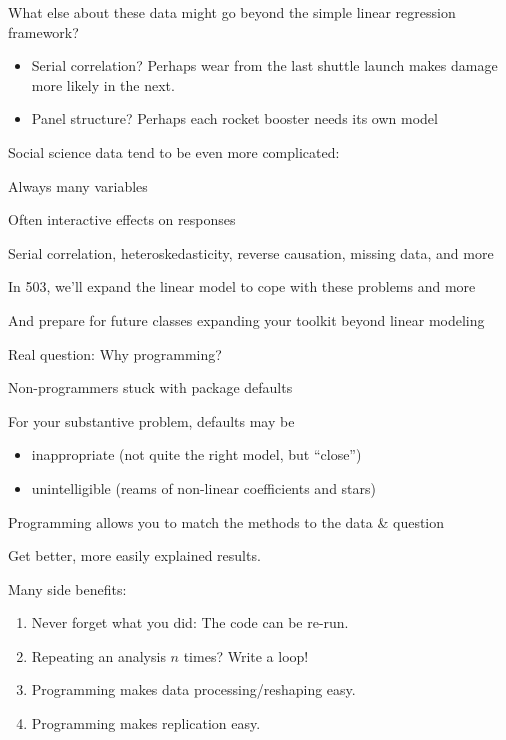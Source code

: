 \documentclass[pdflatex,landscape,titlepage]{foils}
\begin{document}
What else about these data might go beyond the simple linear regression framework?

\begin{itemize}
\item Serial correlation?  Perhaps wear from the last shuttle launch makes damage more likely in the next.

\item Panel structure?  Perhaps each rocket booster needs its own model
\end{itemize}

\bgclear

Social science data tend to be even more complicated:

Always many variables

Often interactive effects on responses

Serial correlation, heteroskedasticity, reverse causation, missing data, and more

In 503, we'll expand the linear model to cope with these problems and more

And prepare for future classes expanding your toolkit beyond linear modeling







\bgclear

Real question:  Why programming?

\vspace{ 1 em}

Non-programmers stuck with package defaults

For your substantive problem, defaults may be 

\begin{itemize}
\item inappropriate (not quite the right model, but ``close'')

\item unintelligible (reams of non-linear coefficients and stars)
\end{itemize}

Programming allows you to match the methods to the data \& question

Get better, more easily explained results.

\bgclear

Many side benefits:

\begin{enumerate}
\item Never forget what you did:  The code can be re-run.

\item Repeating an analysis $n$ times?  Write a loop!

\item Programming makes data processing/reshaping easy.

\item Programming makes replication easy.
\end{enumerate}
\end{document}
